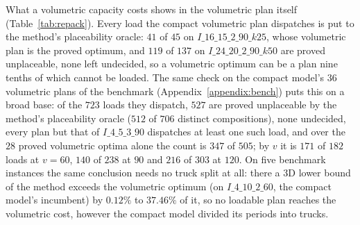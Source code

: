 What a volumetric capacity costs shows in the volumetric plan itself
(Table~\ref{tab:repack}). Every load the compact volumetric plan
dispatches is put to the method's placeability oracle: $41$ of $45$ on
$I\_16\_15\_2\_90\_k25$, whose volumetric plan is the proved optimum,
and $119$ of $137$ on $I\_24\_20\_2\_90\_k50$ are proved unplaceable,
none left undecided, so a volumetric optimum can be a plan nine tenths
of which cannot be loaded.
The same check on the compact model's $36$ volumetric plans of the
benchmark (Appendix~\ref{appendix:bench}) puts this on a broad base:
of the $723$ loads they dispatch, $527$ are proved unplaceable by the
method's placeability oracle ($512$ of $706$ distinct compositions),
none undecided, every plan but that of $I\_4\_5\_3\_90$ dispatches at
least one such load, and over the $28$ proved volumetric optima alone the count
is $347$ of $505$; by $v$ it is $171$ of $182$ loads at $v=60$, $140$
of $238$ at $90$ and $216$ of $303$ at $120$.
On five benchmark instances the same conclusion needs no truck split
at all: there a 3D lower bound of the method exceeds the volumetric
optimum (on $I\_4\_10\_2\_60$, the compact model's incumbent) by
$0.12\%$ to $37.46\%$ of it, so no loadable plan reaches the volumetric
cost, however the compact model divided its periods into trucks.

